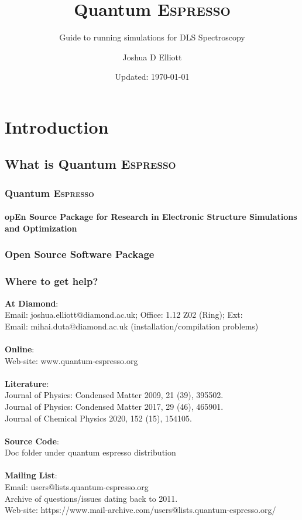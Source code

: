 \documentclass{beamer}
\title{
Quantum \textsc{Espresso}
}
\subtitle[]{
Guide to running simulations for DLS Spectroscopy
}
\author[J D Elliott]{
\footnotesize
Joshua D Elliott
}
\institute[DLS Ltd.]{
Diamond Light Source Ltd.
}
\date[V0.1 2022]{
\footnotesize
Updated: \today
}
\begin{document}
\frame{\titlepage}

\section{Introduction}

\subsection{What is Quantum \textsc{Espresso}}

\begin{frame}
\footnotesize
\frametitle{Quantum \textsc{Espresso}}
\framesubtitle{opEn Source Package for Research in Electronic Structure
Simulations and Optimization}
\end{frame}

\begin{frame}
\footnotesize
\frametitle{Open Source Software Package}



\end{frame}


\begin{frame}
\footnotesize
\frametitle{Where to get help?}

\alert{\textbf{At Diamond}}:\\
Email: joshua.elliott@diamond.ac.uk; Office: 1.12 Z02 (Ring); Ext:\\
Email: mihai.duta@diamond.ac.uk (installation/compilation problems)\\~\\

\textbf{Online}:\\
Web-site: www.quantum-espresso.org\\~\\

\textbf{Literature}:\\
Journal of Physics: Condensed Matter 2009, 21 (39), 395502.\\
Journal of Physics: Condensed Matter 2017, 29 (46), 465901.\\
Journal of Chemical Physics 2020, 152 (15), 154105.\\~\\

\textbf{Source Code}:\\
Doc folder under quantum espresso distribution\\~\\

\textbf{Mailing List}:\\
Email: users@lists.quantum-espresso.org\\
Archive of questions/issues dating back to 2011.\\
Web-site: https://www.mail-archive.com/users@lists.quantum-espresso.org/
\end{frame}
\end{document}
